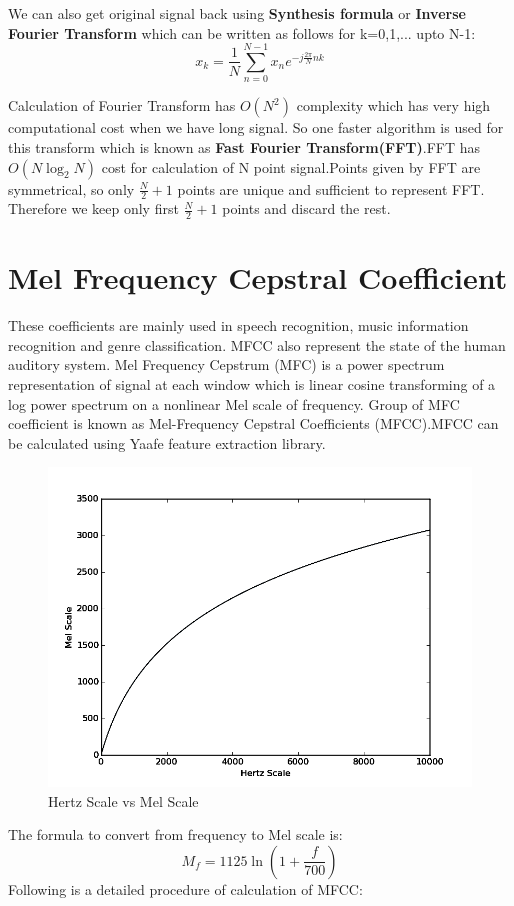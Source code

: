 \documentclass[11pt]{report}
\begin{document}
We can also get original signal back using \textbf{Synthesis formula} or \textbf{Inverse Fourier Transform} which can be written as follows for k=0,1,... upto N-1:
\begin{equation}
x_{k}=\frac{1}{N}\sum\limits_{n=0}^{N-1} x_{n} e^ {-j\frac{2\pi}{N}nk} 
\end{equation}

Calculation of Fourier Transform has $O(N^2)$ complexity  which has very high computational cost when we have long signal. So one faster algorithm is used for this transform which is known as \textbf{Fast Fourier Transform(FFT)}.FFT has $O(N\log_{2}N)$ cost for calculation of N point signal.Points given by FFT are symmetrical, so only $\frac{N}{2}+1$ points are unique and sufficient to represent FFT. Therefore we keep only first $\frac{N}{2}+1$ points and discard the rest.








\section{Mel Frequency Cepstral Coefficient}
These coefficients are mainly used in speech recognition, music information recognition and genre classification. 
MFCC also represent the state of the human auditory system.
Mel Frequency Cepstrum (MFC) is a power spectrum representation of signal at each window which is linear cosine transforming of a log power spectrum on a nonlinear Mel scale of frequency. Group of MFC coefficient is known as Mel-Frequency Cepstral Coefficients (MFCC).MFCC can be calculated using Yaafe \cite{yaafe} feature extraction library.



\begin{figure}[h]
\centering
\includegraphics[scale=.4]{./images/mel.png}
\caption{Hertz Scale vs Mel Scale}

\end{figure}
The formula  to convert from frequency to Mel scale is:
\begin{equation}
M_{f}=1125 \ln(1+\frac{f}{700}) 
\end{equation}
Following is a detailed procedure of calculation of MFCC:
\end{document}
